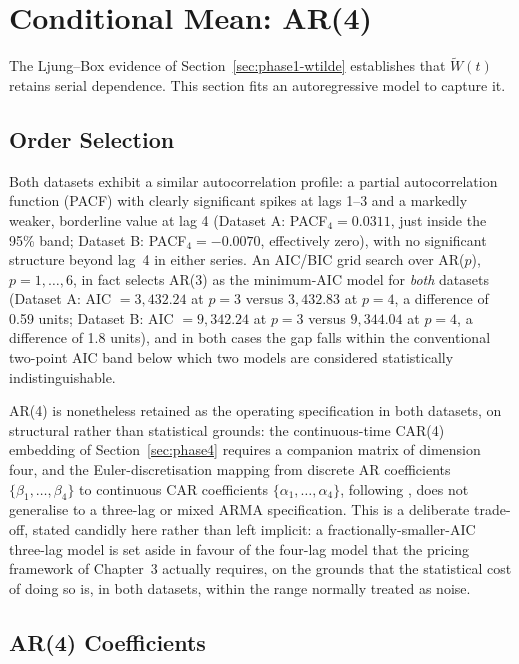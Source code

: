\documentclass[11pt, a4paper, twoside]{article}
\begin{document}
\section{Conditional Mean: AR(4)}
\label{sec:phase2}

The Ljung--Box evidence of Section~\ref{sec:phase1-wtilde} establishes that $\widetilde W(t)$ retains serial dependence. This section fits an autoregressive model to capture it.

\subsection{Order Selection}
\label{sec:phase2-order}

Both datasets exhibit a similar autocorrelation profile: a partial autocorrelation function (PACF) with clearly significant spikes at lags 1--3 and a markedly weaker, borderline value at lag 4 (Dataset A: PACF$_4 = 0.0311$, just inside the 95\% band; Dataset B: PACF$_4 = -0.0070$, effectively zero), with no significant structure beyond lag~4 in either series. An AIC/BIC grid search over AR($p$), $p = 1,\dots,6$, in fact selects AR(3) as the minimum-AIC model for \emph{both} datasets (Dataset A: AIC $= 3{,}432.24$ at $p=3$ versus $3{,}432.83$ at $p=4$, a difference of 0.59 units; Dataset B: AIC $=9{,}342.24$ at $p=3$ versus $9{,}344.04$ at $p=4$, a difference of 1.8 units), and in both cases the gap falls within the conventional two-point AIC band below which two models are considered statistically indistinguishable.

AR(4) is nonetheless retained as the operating specification in both datasets, on structural rather than statistical grounds: the continuous-time CAR(4) embedding of Section~\ref{sec:phase4} requires a companion matrix of dimension four, and the Euler-discretisation mapping from discrete AR coefficients $\{\beta_1,\dots,\beta_4\}$ to continuous CAR coefficients $\{\alpha_1,\dots,\alpha_4\}$, following \citet{BenthSaltyteBenth2009}, does not generalise to a three-lag or mixed ARMA specification. This is a deliberate trade-off, stated candidly here rather than left implicit: a fractionally-smaller-AIC three-lag model is set aside in favour of the four-lag model that the pricing framework of Chapter~3 actually requires, on the grounds that the statistical cost of doing so is, in both datasets, within the range normally treated as noise.

\subsection{AR(4) Coefficients}
\label{sec:phase2-coefs}
\end{document}
